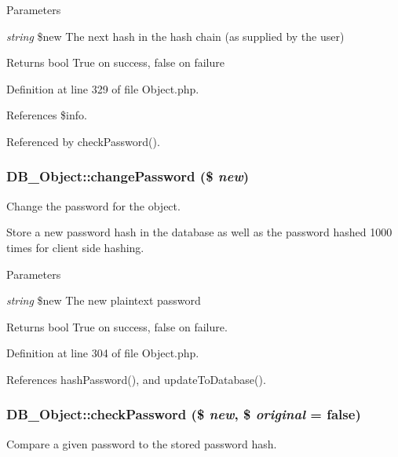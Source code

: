 \begin{DoxyParams}{Parameters}
\item[{\em string}]\$new The next hash in the hash chain (as supplied by the user)\end{DoxyParams}
\begin{DoxyReturn}{Returns}
bool True on success, false on failure 
\end{DoxyReturn}


Definition at line 329 of file Object.php.

References \$info.

Referenced by checkPassword().\hypertarget{classDB__Object_a07519cd100d61b0985073f410f6456dd}{
\subsubsection[{changePassword}]{\setlength{\rightskip}{0pt plus 5cm}DB\_\-Object::changePassword (\$ {\em new})}}
\label{dc/d6d/classDB__Object_a07519cd100d61b0985073f410f6456dd}
Change the password for the object.

Store a new password hash in the database as well as the password hashed 1000 times for client side hashing.


\begin{DoxyParams}{Parameters}
\item[{\em string}]\$new The new plaintext password\end{DoxyParams}
\begin{DoxyReturn}{Returns}
bool True on success, false on failure. 
\end{DoxyReturn}


Definition at line 304 of file Object.php.

References hashPassword(), and updateToDatabase().\hypertarget{classDB__Object_a8bd5723454893098af658c007c93a7c5}{
\subsubsection[{checkPassword}]{\setlength{\rightskip}{0pt plus 5cm}DB\_\-Object::checkPassword (\$ {\em new}, \/  \$ {\em original} = {\ttfamily false})}}
\label{dc/d6d/classDB__Object_a8bd5723454893098af658c007c93a7c5}
Compare a given password to the stored password hash.



